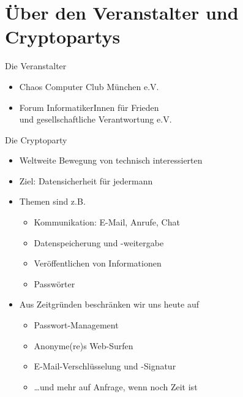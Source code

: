 \section{Über den Veranstalter und Cryptopartys}
  \begin{frame}{Die Veranstalter}
    \begin{itemize}
      \item Chaos Computer Club München e.V.
      \item Forum InformatikerInnen für Frieden\\und gesellschaftliche Verantwortung e.V.
    \end{itemize}
  \end{frame}
  \begin{frame}{Die Cryptoparty}
    \begin{itemize}
      \item Weltweite Bewegung von technisch interessierten
      \item Ziel: Datensicherheit für jedermann
      \item Themen sind z.B.
      \begin{itemize}
        \item Kommunikation: E-Mail, Anrufe, Chat
        \item Datenspeicherung und -weitergabe
        \item Veröffentlichen von Informationen
        \item Passwörter
      \end{itemize}
      \item Aus Zeitgründen beschränken wir uns heute auf 
      \begin{itemize}
        \item Passwort-Management
        \item Anonyme(re)s Web-Surfen
        \item E-Mail-Verschlüsselung und -Signatur
        \item \ldots und mehr auf Anfrage, wenn noch Zeit ist
      \end{itemize}
    \end{itemize}
  \end{frame}

